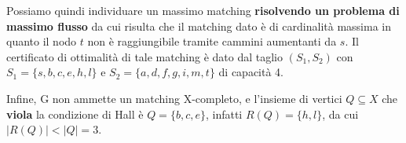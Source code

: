 \documentclass[10pt,a4paper,titlepage]{article}
\theoremstyle{break}
\theoremstyle{break}
\theoremstyle{break}
\begin{document}
\begin{enumerate}
\begin{multicols}{2}
\end{multicols}

Possiamo quindi individuare un massimo matching \textbf{risolvendo un problema di massimo flusso} da cui risulta che il matching dato è di cardinalità massima in quanto il nodo $t$ non è raggiungibile tramite cammini aumentanti da $s$. Il certificato di ottimalità di tale matching è dato dal taglio $(S_1, S_2)$ con $S_1 =\lbrace s, b, c, e, h, l \rbrace$ e $S_2 = \lbrace a, d, f, g, i, m, t \rbrace$ di capacità 4.

Infine, G non ammette un matching X-completo, e l'insieme di vertici $Q \subseteq X$ che \textbf{viola} la condizione di Hall è $Q = \lbrace b, c, e \rbrace$, infatti $R(Q) = \lbrace h, l \rbrace$, da cui $|R(Q)| < |Q| = 3$.






\end{enumerate}
\end{document}
